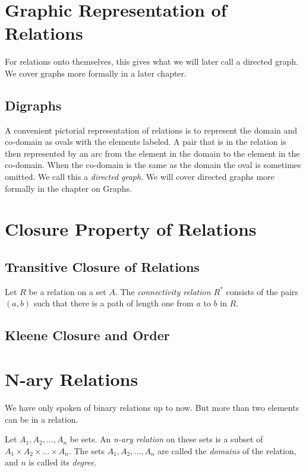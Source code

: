 \section {Graphic Representation of Relations}
For relations onto themselves, this gives what we will later call a directed graph. We cover graphs more formally in a later chapter.
    \subsection {Digraphs}
    A convenient pictorial representation of relations is to represent the domain and co-domain as ovals with the elements labeled. A pair that is in the relation is then represented by an arc from the element in the domain to the element in the co-domain. When the co-domain is the same as the domain the oval is sometimes omitted. We call this a \textit{directed graph}. We will cover directed graphs more formally in the chapter on Graphs.  

\section {Closure Property of Relations}
   \subsection {Transitive Closure of Relations}
   
   \begin{definition}
   Let $R$ be a relation on a set $A$. The \textit{connectivity relation $R^*$} consists of the pairs $(a,b)$ such that there is a path of length one from $a$ to $b$ in $R$.
   \end{definition}
   \subsection {Kleene Closure and Order}

\section {N-ary Relations}
We have only spoken of binary relations up to now. But more than two elements can be in a relation. 
\begin{definition}
Let $A_1,A_2, \dots ,A_n$ be sets. An \textit{n-ary relation} on these sets is a subset of $A_1 \times A_2 \times \dots \times A_n$. The sets $A_1,A_2, \dots ,A_n$ are called the \textit{domains} of the relation, and $n$ is called its \textit{degree}.
\end{definition}

